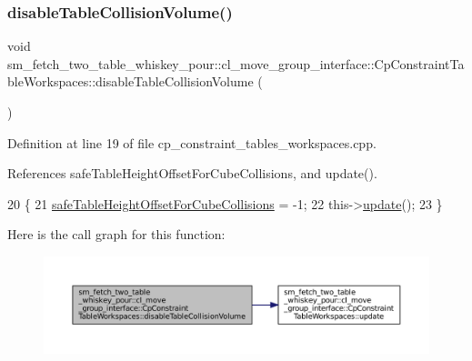 \subsubsection{\texorpdfstring{disable\+Table\+Collision\+Volume()}{disableTableCollisionVolume()}}
{\footnotesize\ttfamily void sm\+\_\+fetch\+\_\+two\+\_\+table\+\_\+whiskey\+\_\+pour\+::cl\+\_\+move\+\_\+group\+\_\+interface\+::\+Cp\+Constraint\+Table\+Workspaces\+::disable\+Table\+Collision\+Volume (\begin{DoxyParamCaption}{ }\end{DoxyParamCaption})}



Definition at line 19 of file cp\+\_\+constraint\+\_\+tables\+\_\+workspaces.\+cpp.



References safe\+Table\+Height\+Offset\+For\+Cube\+Collisions, and update().


\begin{DoxyCode}
20         \{
21             \hyperlink{classsm__fetch__two__table__whiskey__pour_1_1cl__move__group__interface_1_1CpConstraintTableWorkspaces_a16a18c331ca1476ec1fb021dc0c0be97}{safeTableHeightOffsetForCubeCollisions} = -1;
22             this->\hyperlink{classsm__fetch__two__table__whiskey__pour_1_1cl__move__group__interface_1_1CpConstraintTableWorkspaces_a7c8e7186aff561f2a1721145814add82}{update}();
23         \}
\end{DoxyCode}
Here is the call graph for this function\+:
\nopagebreak
\begin{figure}[H]
\begin{center}
\leavevmode
\includegraphics[width=350pt]{classsm__fetch__two__table__whiskey__pour_1_1cl__move__group__interface_1_1CpConstraintTableWorkspaces_aad2794eec4d7247bc8e5c984fcacc6a7_cgraph}
\end{center}
\end{figure}
\mbox{\label{classsm__fetch__two__table__whiskey__pour_1_1cl__move__group__interface_1_1CpConstraintTableWorkspaces_a6d333c263396864c34db183ea530f73c}} 
